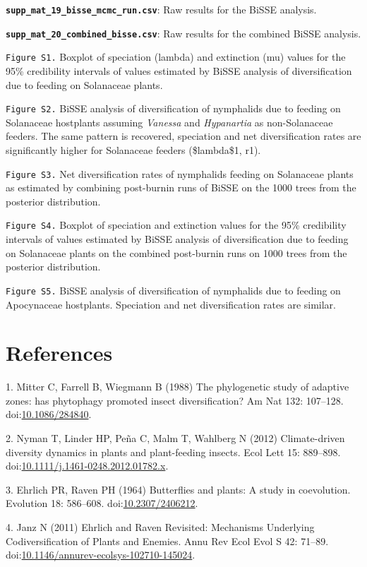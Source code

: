 \documentclass[10pt]{article}
\begin{document}
\textbf{\texttt{supp\_mat\_19\_bisse\_mcmc\_run.csv}}: Raw results for
the BiSSE analysis.

\textbf{\texttt{supp\_mat\_20\_combined\_bisse.csv}}: Raw results for
the combined BiSSE analysis.

\texttt{Figure S1.} Boxplot of speciation (lambda) and extinction (mu)
values for the 95\% credibility intervals of values estimated by BiSSE
analysis of diversification due to feeding on Solanaceae plants.

\texttt{Figure S2.} BiSSE analysis of diversification of nymphalids due
to feeding on Solanaceae hostplants assuming \emph{Vanessa} and
\emph{Hypanartia} as non-Solanaceae feeders. The same pattern is
recovered, speciation and net diversification rates are significantly
higher for Solanaceae feeders (\$lambda\$1, r1).

\texttt{Figure S3.} Net diversification rates of nymphalids feeding on
Solanaceae plants as estimated by combining post-burnin runs of BiSSE on
the 1000 trees from the posterior distribution.

\texttt{Figure S4.} Boxplot of speciation and extinction values for the
95\% credibility intervals of values estimated by BiSSE analysis of
diversification due to feeding on Solanaceae plants on the combined
post-burnin runs on 1000 trees from the posterior distribution.

\texttt{Figure S5.} BiSSE analysis of diversification of nymphalids due
to feeding on Apocynaceae hostplants. Speciation and net diversification
rates are similar.

\section*{References}
1. Mitter C, Farrell B, Wiegmann B (1988) The phylogenetic study of
adaptive zones: has phytophagy promoted insect diversification? Am Nat
132: 107--128.
doi:\href{http://dx.doi.org/10.1086/284840}{10.1086/284840}.

2. Nyman T, Linder HP, Peña C, Malm T, Wahlberg N (2012) Climate-driven
diversity dynamics in plants and plant-feeding insects. Ecol Lett 15:
889--898.
doi:\href{http://dx.doi.org/10.1111/j.1461-0248.2012.01782.x}{10.1111/j.1461-0248.2012.01782.x}.

3. Ehrlich PR, Raven PH (1964) Butterflies and plants: A study in
coevolution. Evolution 18: 586--608.
doi:\href{http://dx.doi.org/10.2307/2406212}{10.2307/2406212}.

4. Janz N (2011) Ehrlich and Raven Revisited: Mechanisms Underlying
Codiversification of Plants and Enemies. Annu Rev Ecol Evol S 42:
71--89.
doi:\href{http://dx.doi.org/10.1146/annurev-ecolsys-102710-145024}{10.1146/annurev-ecolsys-102710-145024}.
\end{document}
